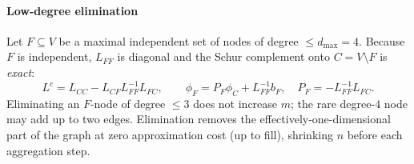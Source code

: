 \documentclass[leqno,letterpaper]{etna}
\begin{document}
\paragraph{Low-degree elimination} Let $F\subseteq V$ be a maximal independent set of
nodes of degree $\le d_{\max}=4$. Because $F$ is independent, $L_{FF}$ is diagonal and the
Schur complement onto $C=V\setminus F$ is \emph{exact}:
\begin{equation}\label{eq:elim}
L^c=L_{CC}-L_{CF}L_{FF}^{-1}L_{FC},\qquad
\phi_F=P_F\phi_C+L_{FF}^{-1}b_F,\quad P_F=-L_{FF}^{-1}L_{FC}.
\end{equation}
Eliminating an $F$-node of degree $\le 3$ does not increase $m$; the rare degree-$4$ node
may add up to two edges. Elimination removes the effectively-one-dimensional part of the graph at
zero approximation cost (up to fill), shrinking $n$ before each aggregation step.
\end{document}
